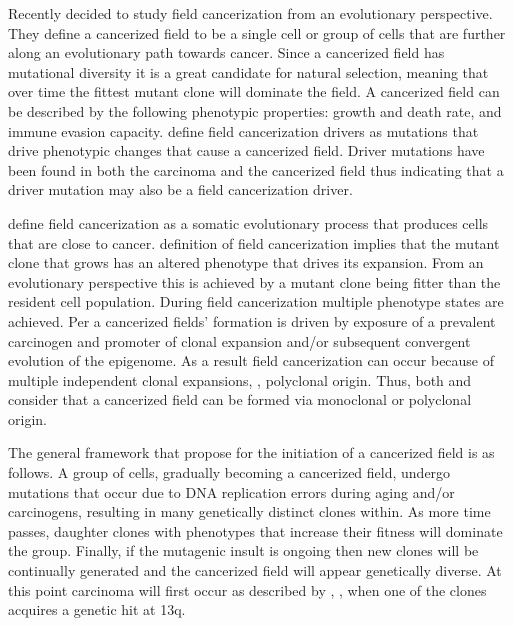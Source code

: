 \documentclass[\main/thesis.tex]{subfiles}
\begin{document}
Recently \textcite{Curtius} decided to study field cancerization from an  evolutionary perspective. They define a cancerized field to be a single cell or group of cells that are further along an evolutionary path towards cancer. Since a cancerized field has mutational diversity it is a great candidate for natural selection, meaning that over time the fittest mutant clone will dominate the field. A cancerized field can be described by the following phenotypic properties: growth and death rate, and immune evasion capacity. \textcite{Curtius} define field cancerization drivers as mutations that drive phenotypic changes that cause a cancerized field. Driver mutations have been found in both the carcinoma and the cancerized field thus indicating that a driver mutation may also be a field cancerization driver. 

\textcite{Curtius} define field cancerization as a somatic evolutionary process that produces cells that are close to cancer. \textcite{Braakhuis} definition of field cancerization implies that the mutant clone that grows has an altered phenotype that drives its expansion. From an evolutionary perspective this is achieved by a mutant clone being fitter than the resident cell population. During field cancerization multiple phenotype states are achieved. Per \textcite{Curtius} a cancerized fields' formation is driven by exposure of a prevalent carcinogen and promoter of clonal expansion and/or subsequent convergent evolution of the epigenome. As a result field cancerization can occur because of multiple independent clonal expansions, \ie, polyclonal origin. Thus, both \textcite{Simple} and \textcite{Curtius} consider that a cancerized field can be formed via monoclonal or polyclonal origin.

The general framework that \textcite{Curtius} propose for the initiation of a cancerized field is as follows. A group of cells, gradually becoming a  cancerized field, undergo mutations that occur due to DNA replication errors during aging and/or carcinogens, resulting in many genetically distinct clones within. As more time passes, daughter clones with phenotypes that increase their fitness will dominate the group. Finally, if the mutagenic insult is ongoing then new clones will be continually generated and the cancerized field will appear genetically diverse. At this point carcinoma will first occur as described by \textcite{Simple}, \ie, when one of the clones acquires a genetic hit at 13q.  
\end{document}
